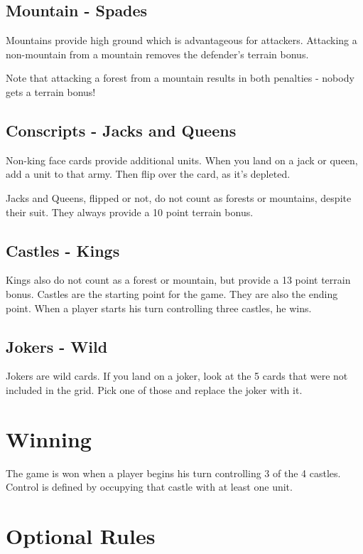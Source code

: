 \documentclass{article}
\begin{document}
\subsection{Mountain - Spades}

Mountains provide high ground which is advantageous for attackers.  Attacking a non-mountain from a mountain removes the defender's terrain bonus.

Note that attacking a forest from a mountain results in both penalties - nobody gets a terrain bonus! 

\subsection{Conscripts - Jacks and Queens}

Non-king face cards provide additional units.  When you land on a jack or queen, add a unit to that army.  Then flip over the card, as it's depleted.

Jacks and Queens, flipped or not, do not count as forests or mountains, despite their suit.  They always provide a 10 point terrain bonus.  

\subsection{Castles - Kings}

Kings also do not count as a forest or mountain, but provide a 13 point terrain bonus.  Castles are the starting point for the game.  They are also the ending point.  When a player starts his turn controlling three castles, he wins.

\subsection{Jokers - Wild}

Jokers are wild cards.  If you land on a joker, look at the 5 cards that were not included in the grid.  Pick one of those and replace the joker with it.

\section{Winning}

The game is won when a player begins his turn controlling 3 of the 4 castles.  Control is defined by occupying that castle with at least one unit.


\newpage
\section{Optional Rules}
\end{document}

